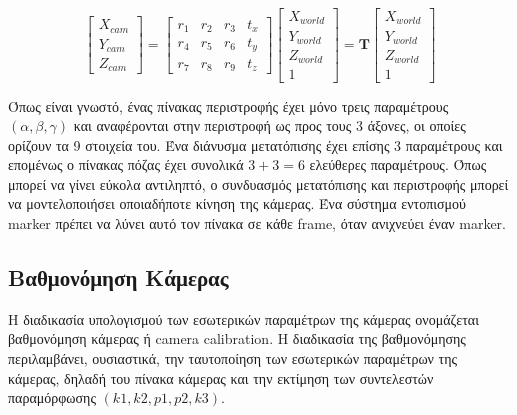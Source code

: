 \begin{equation}
\begin{bmatrix}
X_{cam} \\ Y_{cam} \\ Z_{cam}
\end{bmatrix}
=
\begin{bmatrix}
r_{1} & r_{2} & r_{3} & t_{x}\\
r_{4} & r_{5} & r_{6} & t_{y}\\
r_{7} & r_{8} & r_{9} & t_{z}
\end{bmatrix}
\begin{bmatrix}
X_{world}\\
Y_{world}\\
Z_{world}\\
1
\end{bmatrix}
=\mathbf{T}\begin{bmatrix}
X_{world}\\
Y_{world}\\
Z_{world}\\
1
\end{bmatrix}
\end{equation}

Όπως είναι γνωστό, ένας πίνακας περιστροφής έχει μόνο τρεις παραμέτρους $(\alpha, \beta, \gamma)$ και αναφέρονται στην περιστροφή ως προς τους 3 άξονες, οι οποίες ορίζουν τα 9 στοιχεία του. Ένα διάνυσμα μετατόπισης έχει επίσης 3 παραμέτρους και επομένως ο πίνακας πόζας έχει συνολικά $3+3=6$ ελεύθερες παραμέτρους. Όπως μπορεί να γίνει εύκολα αντιληπτό, ο συνδυασμός μετατόπισης και περιστροφής μπορεί να μοντελοποιήσει οποιαδήποτε κίνηση της κάμερας. Ένα σύστημα εντοπισμού marker πρέπει να λύνει αυτό τον πίνακα σε κάθε frame, όταν ανιχνεύει έναν marker.






\subsection{Βαθμονόμηση Κάμερας}


Η διαδικασία υπολογισμού των εσωτερικών παραμέτρων της κάμερας ονομάζεται βαθμονόμηση κάμερας ή camera calibration. 
Η διαδικασία της βαθμονόμησης περιλαμβάνει, ουσιαστικά, την ταυτοποίηση των εσωτερικών παραμέτρων της κάμερας, δηλαδή του πίνακα κάμερας και την εκτίμηση των συντελεστών παραμόρφωσης $(k1, k2, p1, p2, k3)$.

